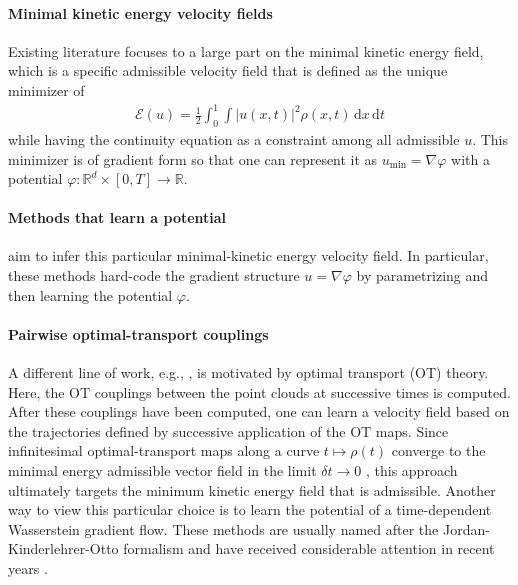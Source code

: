 \documentclass{article}
\theoremstyle{definition}
\theoremstyle{plain}
\theoremstyle{definition}
\theoremstyle{remark}
\begin{document}
\paragraph{Minimal kinetic energy velocity fields} Existing literature focuses to a large part on  the minimal kinetic energy field, which is a specific admissible velocity field that is defined as the unique minimizer of
\begin{align}\label{eq:MinKinEnergy}
    \mathcal{E}(u) = \frac12 \int_0^1 \int |u(x, t)|^2 \rho(x, t)\, \mathrm dx \, \mathrm dt
\end{align}
while having the continuity equation as a constraint among all admissible $u$. This minimizer is of gradient form so that one can represent it as $u_{\min}=\nabla \varphi$ with a potential $\varphi: \mathbb{R}^d \times [0, T] \to \mathbb{R}$. 

\vspace*{-0.25cm}\paragraph{Methods that learn a potential} \citet{neklyudov_action_2023, berman_parametric_2024, blickhan2025dicediscreteinversecontinuity} aim to infer this particular minimal-kinetic energy velocity field. In particular, these methods hard-code the gradient structure $u = \nabla \varphi$ by parametrizing and then learning the potential $\varphi$. 

\vspace*{-0.35cm}\paragraph{Pairwise optimal-transport couplings} A different line of work, e.g., \cite{terpin_2024_learning}, is motivated by optimal transport (OT) theory. Here, the OT couplings between the point clouds at successive times is computed. After these couplings have been computed, one can learn a velocity field based on the trajectories defined by successive application of the OT maps. Since infinitesimal optimal-transport maps along a curve $t \mapsto \rho(t)$ converge to the minimal energy admissible vector field in the limit $\delta t \to 0$ \citep[Proposition 8.4.6]{ambrosio_gradient_2005}, this approach ultimately targets the minimum kinetic energy field that is admissible. Another way to view this particular choice is to learn the potential of a time-dependent Wasserstein gradient flow. These methods are usually named after the Jordan-Kinderlehrer-Otto formalism \cite{jordan_variational_1998} and have received considerable attention in recent years \cite{tong_trajectorynet_2020, alvarez-melis_optimizing_2021, bunne_proximal_2022, lavenant_towards_2023, persiianov_learning_2025}.
\end{document}
